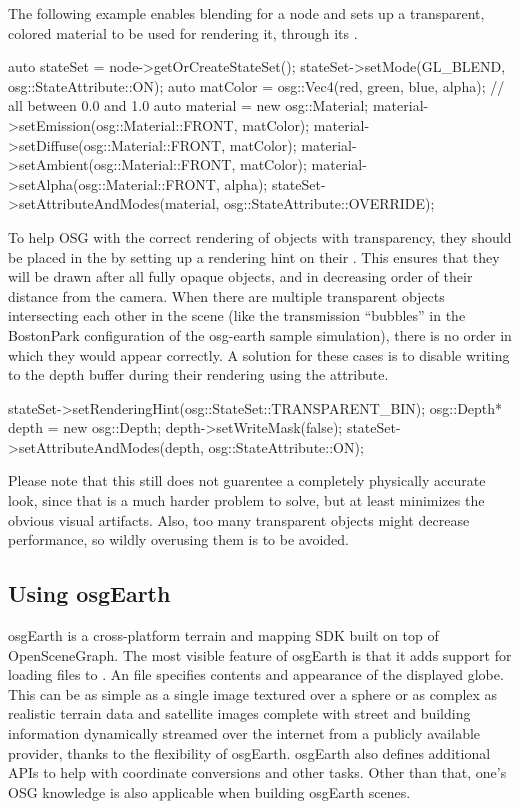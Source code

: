 The following example enables blending for a node and sets up a
transparent, colored material to be used for rendering it, through its
.

\begin{cpp}
auto stateSet = node->getOrCreateStateSet();
stateSet->setMode(GL_BLEND, osg::StateAttribute::ON);
auto matColor = osg::Vec4(red, green, blue, alpha); // all between 0.0 and 1.0
auto material = new osg::Material;
material->setEmission(osg::Material::FRONT, matColor);
material->setDiffuse(osg::Material::FRONT, matColor);
material->setAmbient(osg::Material::FRONT, matColor);
material->setAlpha(osg::Material::FRONT, alpha);
stateSet->setAttributeAndModes(material, osg::StateAttribute::OVERRIDE);
\end{cpp}

To help OSG with the correct rendering of objects with transparency, they
should be placed in the  by setting up a rendering hint
on their . This ensures that they will be drawn after all
fully opaque objects, and in decreasing order of their distance from the camera.
When there are multiple transparent objects intersecting each other in the scene
(like the transmission ``bubbles'' in the BostonPark configuration of the
osg-earth sample simulation), there is no order in which they would appear correctly. A
solution for these cases is to disable writing to the depth buffer during their
rendering using the  attribute.

\begin{cpp}
stateSet->setRenderingHint(osg::StateSet::TRANSPARENT_BIN);
osg::Depth* depth = new osg::Depth;
depth->setWriteMask(false);
stateSet->setAttributeAndModes(depth, osg::StateAttribute::ON);
\end{cpp}

Please note that this still does not guarentee a completely physically accurate
look, since that is a much harder problem to solve, but at least minimizes the
obvious visual artifacts. Also, too many transparent objects might decrease
performance, so wildly overusing them is to be avoided.


\subsection{Using osgEarth}

osgEarth is a cross-platform terrain and mapping SDK built on top of OpenSceneGraph.
The most visible feature of osgEarth is that it adds support for loading 
files to . An  file specifies contents and
appearance of the displayed globe. This can be as simple as a single image
textured over a sphere or as complex as realistic terrain data and
satellite images complete with street and building information dynamically
streamed over the internet from a publicly available provider, thanks to
the flexibility of osgEarth. osgEarth also defines additional APIs
to help with coordinate conversions and other tasks. Other than that,
one's OSG knowledge is also applicable when building osgEarth scenes.


